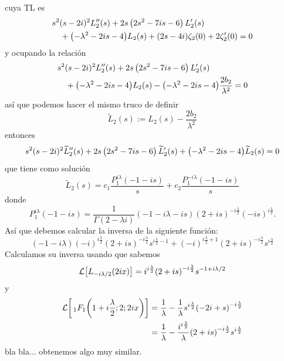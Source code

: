 \documentclass[%
 aip,
 jmp,%
 amsmath,amssymb,
 reprint,%
]{revtex4-2}
\begin{document}
{cuya TL es
\begin{equation*}
\begin{aligned}
    & s^2 (s-2 i)^2 L_2''(s)+2 s \left(2 s^2-7 i s-6\right)L_2'(s)\\
    &\quad +\qty(-\lambda^2 - 2is - 4)L_2(s)+\qty(2s - 4i)\zeta_2(0) + 2\zeta_2'(0) = 0
\end{aligned}
\end{equation*}
y ocupando la relación
\begin{equation}
\begin{aligned}
    & s^2 (s-2 i)^2 L_2''(s)+2 s \left(2 s^2-7 i s-6\right)L_2'(s)\\
    &\quad +\qty(-\lambda^2 - 2is - 4)L_2(s) - \qty(- \lambda^2 -2is - 4)\frac{2b_2}{\lambda^2} = 0
\end{aligned}
\end{equation}
así que podemos hacer el mismo truco de definir
\begin{equation}
    \widetilde{L}_2(s) := L_2(s) - \frac{2b_2}{\lambda^2}
\end{equation}
entonces
\begin{equation}
s^2 (s-2 i)^2 \widetilde{L}_2''(s)+2 s \left(2 s^2-7 i s-6\right)\widetilde{L}_2'(s)+\qty(-\lambda^2 - 2is - 4)\widetilde{L}_2(s) = 0
\end{equation}
que tiene como solución
\begin{equation}
    \widetilde{L}_2(s) = c_1\frac{P^{i\lambda}_1(-1-is)}{s} + c_2\frac{P^{-i\lambda}_1(-1-is)}{s}
\end{equation}
donde
\begin{equation}\label{eq:P_1-zeta2}
    P_1^{i\lambda}(-1 - is) = \frac{1}{\Gamma(2 - \lambda i)}(- 1 - i\lambda - is)(2 + is)^{-i\frac{\lambda}{2}}(-is)^{i\frac{\lambda}{2}}.
\end{equation}
Así que debemos calcular la inversa de la siguiente función:
\begin{equation*}
    (-1-i\lambda)(-i)^{i\frac{\lambda}{2}}(2 + is)^{-i\frac{\lambda}{2}}s^{i\frac{\lambda}{2} - 1}  + (-i)^{i\frac{\lambda}{2} + 1}(2 + is)^{-i\frac{\lambda}{2}}s^{i\frac{\lambda}{2}}
\end{equation*}
Calculamos su inversa usando que sabemos
\begin{equation*}
\begin{aligned}
    \mathcal{L}\qty[L_{-i\lambda/2}(2ix)] = i^{i\frac{\lambda}{2}}\qty(2 + is)^{-i\frac{\lambda}{2}}s^{-1 + i\lambda/2}
\end{aligned}
\end{equation*}
y
\begin{equation*}
\begin{aligned}
    \mathcal{L}\qty[\,_1F_1\qty(1+i\frac{\lambda}{2}; 2; 2ix)] &= \frac{1}{\lambda} - \frac{1}{\lambda}s^{i\frac{\lambda}{2}}\qty(-2i + s)^{-i\frac{\lambda}{2}}\\
    &= \frac{1}{\lambda} - \frac{i^{i\frac{\lambda}{2}}}{\lambda}\qty(2 + is)^{-i\frac{\lambda}{2}}s^{i\frac{\lambda}{2}}
\end{aligned}
\end{equation*}
bla bla... obtenemos algo muy similar.

}
\end{document}
